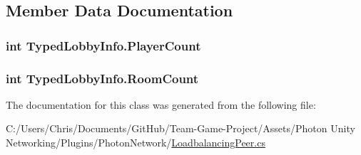 \subsection{Member Data Documentation}
\subsubsection[{\texorpdfstring{Player\+Count}{PlayerCount}}]{\setlength{\rightskip}{0pt plus 5cm}int Typed\+Lobby\+Info.\+Player\+Count}\hypertarget{class_typed_lobby_info_a5b7b6fb52a3b9813e8b2af49459c6475}{}\label{class_typed_lobby_info_a5b7b6fb52a3b9813e8b2af49459c6475}
\subsubsection[{\texorpdfstring{Room\+Count}{RoomCount}}]{\setlength{\rightskip}{0pt plus 5cm}int Typed\+Lobby\+Info.\+Room\+Count}\hypertarget{class_typed_lobby_info_a948789896eb6815a2628681f338d754b}{}\label{class_typed_lobby_info_a948789896eb6815a2628681f338d754b}


The documentation for this class was generated from the following file\+:\begin{DoxyCompactItemize}
\item 
C\+:/\+Users/\+Chris/\+Documents/\+Git\+Hub/\+Team-\/\+Game-\/\+Project/\+Assets/\+Photon Unity Networking/\+Plugins/\+Photon\+Network/\hyperlink{_loadbalancing_peer_8cs}{Loadbalancing\+Peer.\+cs}\end{DoxyCompactItemize}
